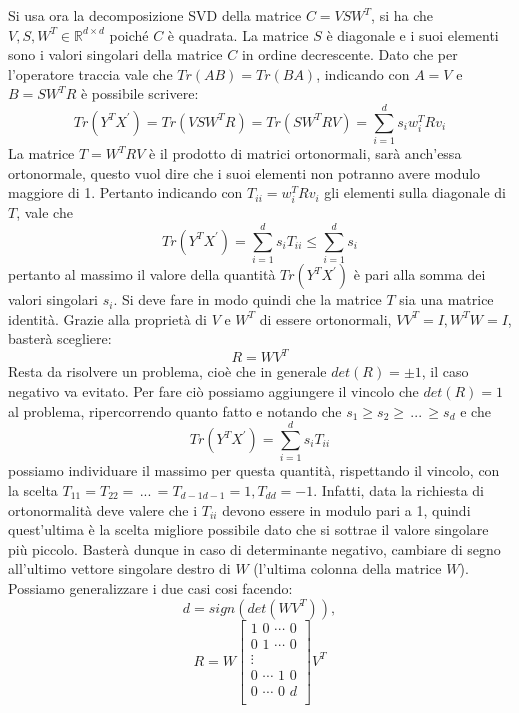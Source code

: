 Si usa ora la decomposizione SVD della matrice $C = VSW^T$, si ha che $V, S, W^T \in \mathbb{R}^{d \times d}$ poiché $C$ è quadrata. La matrice $S$ è diagonale e i suoi elementi sono i valori singolari della matrice $C$ in ordine decrescente.
Dato che per l'operatore traccia vale che $Tr(AB) = Tr(BA)$, indicando con $A = V$ e $B = SW^TR$ è possibile scrivere:
\begin{equation}
	Tr(Y^{T}X^{'}) = Tr(VSW^TR) = Tr(SW^TRV) = \sum_{i = 1}^{d} s_iw_i^TRv_i
\end{equation}
La matrice $T = W^TRV$ è il prodotto di matrici ortonormali, sarà anch'essa ortonormale, questo vuol dire che i suoi elementi non potranno avere modulo maggiore di 1. Pertanto indicando con $T_{ii} = w_i^TRv_i$ gli elementi sulla diagonale di $T$, vale che
\begin{equation}
	Tr(Y^{T}X^{'}) = \sum_{i = 1}^{d} s_iT_{ii} \leq \sum_{i = 1}^{d} s_i
\end{equation}
 pertanto al massimo il valore della quantità $Tr(Y^{T}X^{'})$ è pari alla somma dei valori singolari $s_i$. Si deve fare in modo quindi che la matrice $T$ sia una matrice identità.
 Grazie alla proprietà di $V$ e $W^T$ di essere ortonormali, $VV^T = I, W^TW = I$, basterà scegliere:
 \begin{equation}
 	R = WV^T
 \end{equation}
Resta da risolvere un problema, cioè che in generale $det(R) = \pm 1$, il caso negativo va evitato.
Per fare ciò possiamo aggiungere il vincolo che $det(R) = 1$ al problema, ripercorrendo quanto fatto e notando che $s_1 \ge s_2 \ge \, ... \, \ge s_d$ e che
\begin{equation}
Tr(Y^{T}X^{'}) = \sum_{i = 1}^{d} s_iT_{ii} 
\end{equation}
possiamo individuare il massimo per questa quantità, rispettando il vincolo, con la scelta $T_{11} = T_{22} = \, ... \, = T_{d-1d-1} = 1, T_{dd} = -1$. Infatti, data la richiesta di ortonormalità deve valere che i $T_{ii}$ devono essere in modulo pari a 1, quindi quest'ultima è la scelta migliore possibile dato che si sottrae il valore singolare più piccolo. Basterà dunque in caso di determinante negativo, cambiare di segno all'ultimo vettore singolare destro di $W$ (l'ultima colonna della matrice $W$). Possiamo generalizzare i due casi cosi facendo:
\begin{equation}
	d = sign(det(WV^T)),
\end{equation}
\begin{equation}
	R = W
	\begin{bmatrix}
	1 \,\, 0 \,\, \cdots \,\, 0\\
	0 \,\, 1 \,\, \cdots \,\, 0\\
	\vdots\\
	0 \,\, \cdots \,\, 1 \,\, 0\\
	0 \,\, \cdots \,\, 0 \,\, d\\
	\end{bmatrix}V^T
\end{equation}

